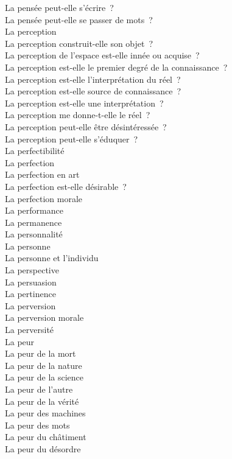 \documentclass[a4paper,12pt]{article}
\begin{document}
La pensée peut-elle s'écrire ? \\
La pensée peut-elle se passer de mots ? \\
La perception \\
La perception construit-elle son objet ? \\
La perception de l'espace est-elle innée ou acquise ? \\
La perception est-elle le premier degré de la connaissance ? \\
La perception est-elle l'interprétation du réel ? \\
La perception est-elle source de connaissance ? \\
La perception est-elle une interprétation ? \\
La perception me donne-t-elle le réel ? \\
La perception peut-elle être désintéressée ? \\
La perception peut-elle s'éduquer ? \\
La perfectibilité \\
La perfection \\
La perfection en art \\
La perfection est-elle désirable ? \\
La perfection morale \\
La performance \\
La permanence \\
La personnalité \\
La personne \\
La personne et l'individu \\
La perspective \\
La persuasion \\
La pertinence \\
La perversion \\
La perversion morale \\
La perversité \\
La peur \\
La peur de la mort \\
La peur de la nature \\
La peur de la science \\
La peur de l'autre \\
La peur de la vérité \\
La peur des machines \\
La peur des mots \\
La peur du châtiment \\
La peur du désordre \\
\end{document}
